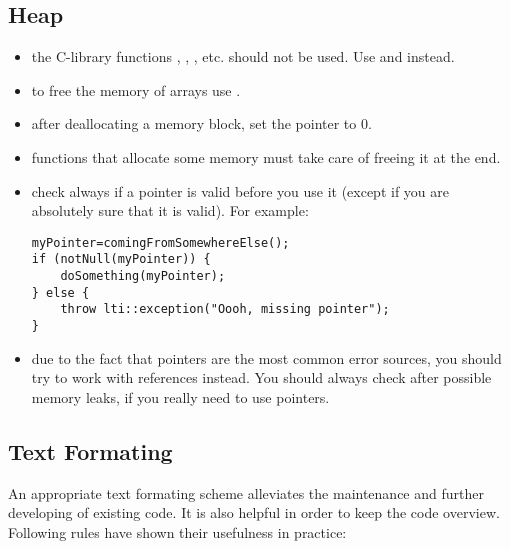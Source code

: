 \subsection{Heap}

\begin{itemize}
\item the C-library functions , , ,
  etc. should not be used.  Use  and  instead.
\item to free the memory of arrays use .
\item after deallocating a memory block, set the pointer to 0.
\item functions that allocate some memory must take care of freeing it at the
  end.
\item check always if a pointer is valid before you use it (except if you are
  absolutely sure that it is valid). For example:
\begin{verbatim}
myPointer=comingFromSomewhereElse();
if (notNull(myPointer)) {
    doSomething(myPointer);
} else {
    throw lti::exception("Oooh, missing pointer");
}
\end{verbatim}
\item due to the fact that pointers are the most common error sources, you
  should try to work with references instead.  You should always check after
  possible memory leaks, if you really need to use pointers.
\end{itemize}

\subsection{Text Formating}

An appropriate text formating scheme alleviates the maintenance and further
developing of existing code.  It is also helpful in order to keep the code
overview.  Following rules have shown their usefulness in practice:

